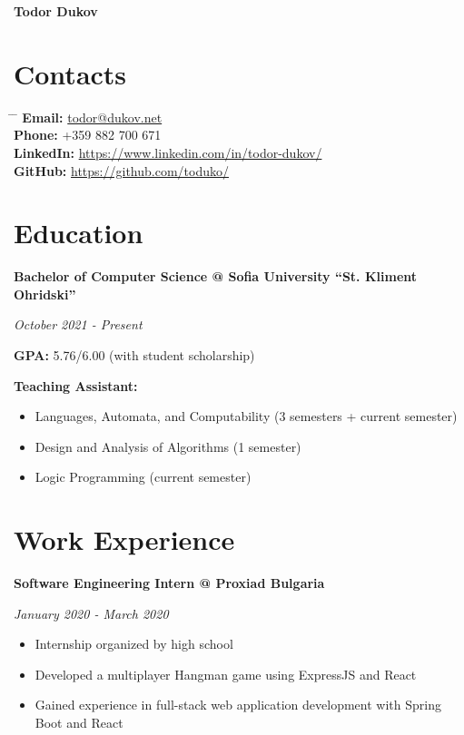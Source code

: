 \documentclass[a4paper,10pt]{article}
\begin{document}
\begin{center}
    \huge{\textbf{Todor Dukov}}
\end{center}

\section*{Contacts}

\begin{tabbing}
    \hspace{4cm} \= \hspace{8cm} \= \kill
    \textbf{Email:} \> \href{mailto:todor@dukov.net}{todor@dukov.net} \\
    \textbf{Phone:} \> +359 882 700 671 \\
    \textbf{LinkedIn:} \> \href{https://www.linkedin.com/in/todor-dukov/}{https://www.linkedin.com/in/todor-dukov/} \\
    \textbf{GitHub:} \> \href{https://github.com/toduko/}{https://github.com/toduko/} \\
\end{tabbing}

\section*{Education}

\textbf{Bachelor of Computer Science @ Sofia University “St. Kliment Ohridski”}

\textit{October 2021 - Present}

\textbf{GPA:} 5.76/6.00 (with student scholarship)

\textbf{Teaching Assistant:}
\begin{itemize}
    \item Languages, Automata, and Computability (3 semesters + current semester)
    \item Design and Analysis of Algorithms (1 semester)
    \item Logic Programming (current semester)
\end{itemize}

\section*{Work Experience}

\textbf{Software Engineering Intern @ Proxiad Bulgaria}

\textit{January 2020 - March 2020}
\begin{itemize}
    \item Internship organized by high school
    \item Developed a multiplayer Hangman game using ExpressJS and React
    \item Gained experience in full-stack web application development with Spring Boot and React
\end{itemize}
\end{document}
